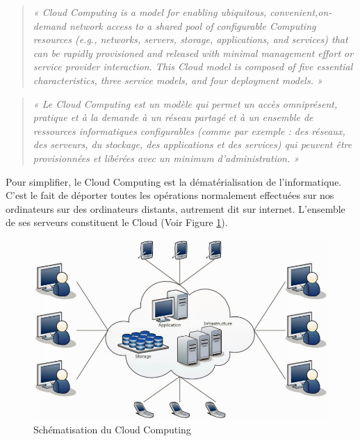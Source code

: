 \documentclass{report}
\begin{document}
    \begin{quotation}
      \emph{« Cloud Computing is a model for enabling ubiquitous, convenient,on-demand network access to a shared pool of configurable Computing resources (e.g., networks, servers, storage, applications, and services) that can be rapidly provisioned and released with minimal management effort or service provider interaction. This Cloud model is composed of five essential characteristics, three service models, and four deployment models. »}
    \end{quotation}

    \begin{quotation}
      \emph{« Le Cloud Computing est un modèle qui permet un accès omniprésent, pratique et à la demande à un réseau partagé et à un ensemble de ressources informatiques configurables (comme par exemple : des réseaux, des serveurs, du stockage, des applications et des services) qui peuvent être provisionnées et libérées avec un minimum d’administration. »}\\
    \end{quotation}

    Pour simplifier, le Cloud Computing est la dématérialisation de l’informatique. C’est le fait de déporter toutes les opérations normalement effectuées sur nos ordinateurs sur des ordinateurs distants, autrement dit sur internet. L’ensemble de ses serveurs constituent le Cloud (Voir Figure \ref{Cloud Computing}).

    \begin{figure}
      \begin{center}
        \includegraphics[scale=0.3]{images/CloudComputing.png}
      \end{center}
      \caption{Schématisation du Cloud Computing}
      \label{Cloud Computing}
    \end{figure}
\end{document}
